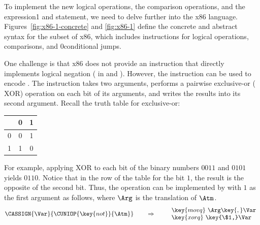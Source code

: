 \documentclass[7x10,nocrop]{TimesAPriori_MIT}%
\def\racketEd{0}
\def\pythonEd{1}
\def\edition{0}
\newcommand{\racket}[1]{{\if\edition\racketEd{#1}\fi}}
\newcommand{\python}[1]{{\if\edition\pythonEd #1\fi}}
\begin{document}
 To implement the new logical operations, the comparison
operations, and the  expression\python{ and statement}, we need to delve further into
the x86 language. Figures~\ref{fig:x86-1-concrete} and \ref{fig:x86-1}
define the concrete and abstract syntax for the \LangXIf{} subset
of x86, which includes instructions for logical operations,
comparisons, and \racket{conditional} jumps.

One challenge is that x86 does not provide an instruction that
directly implements logical negation ( in \LangIf{} and
\LangCIf{}).  However, the  instruction can be used to
encode .  The  instruction takes two arguments,
performs a pairwise exclusive-or ($\mathrm{XOR}$) operation on each
bit of its arguments, and writes the results into its second argument.
Recall the truth table for exclusive-or:
\begin{center}
\begin{tabular}{l|cc}
   & 0 & 1 \\ \hline
0  & 0 & 1 \\
1  & 1 & 0
\end{tabular}
\end{center}
For example, applying $\mathrm{XOR}$ to each bit of the binary numbers
$0011$ and $0101$ yields $0110$. Notice that in the row of the table
for the bit $1$, the result is the opposite of the second bit.  Thus,
the  operation can be implemented by  with $1$ as
the first argument as follows, where $\Arg$ is the translation of
$\Atm$.
\[
\CASSIGN{\Var}{\CUNIOP{\key{not}}{\Atm}}
\qquad\Rightarrow\qquad
\begin{array}{l}
\key{movq}~ \Arg\key{,} \Var\\
\key{xorq}~ \key{\$1,} \Var
\end{array}
\]
\end{document}
